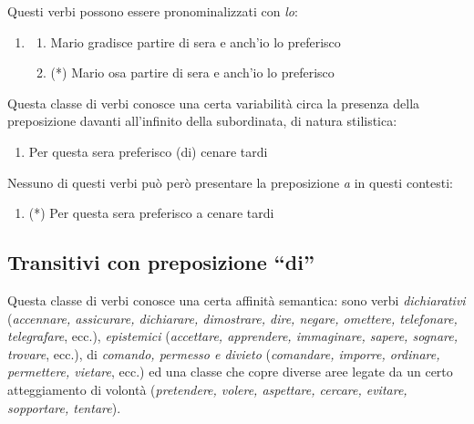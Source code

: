 \documentclass[
  a4paper,
  twoside,
  11pt,
  chapterprefix=false,
  bibliography=totocnumbered,
  listof=flat]{scrbook}
\providecommand{\tightlist}{%
  \setlength{\itemsep}{0pt}\setlength{\parskip}{0pt}}
\begin{document}
Questi verbi possono essere pronominalizzati con \emph{lo}:

\begin{enumerate}
\def\labelenumi{(\arabic{enumi})}
\setcounter{enumi}{57}
\item
  \begin{enumerate}
  \def\labelenumii{\alph{enumii}.}
  \tightlist
  \item
    Mario gradisce partire di sera e anch'io lo preferisco
  \item
    (*) Mario osa partire di sera e anch'io lo preferisco
  \end{enumerate}
\end{enumerate}

Questa classe di verbi conosce una certa variabilità circa la presenza della preposizione davanti all'infinito della subordinata, di natura stilistica:

\begin{enumerate}
\def\labelenumi{(\arabic{enumi})}
\setcounter{enumi}{58}
\tightlist
\item
  Per questa sera preferisco (di) cenare tardi
\end{enumerate}

Nessuno di questi verbi può però presentare la preposizione \emph{a} in questi contesti:

\begin{enumerate}
\def\labelenumi{(\arabic{enumi})}
\setcounter{enumi}{59}
\tightlist
\item
  (*) Per questa sera preferisco a cenare tardi
\end{enumerate}

\hypertarget{transitivi-con-preposizione-di}{%
\subsection{\texorpdfstring{Transitivi con preposizione \enquote{di}}{Transitivi con preposizione ``di''}}\label{transitivi-con-preposizione-di}}

Questa classe di verbi conosce una certa affinità semantica: sono verbi \emph{dichiarativi} (\emph{accennare, assicurare, dichiarare, dimostrare, dire, negare, omettere, telefonare, telegrafare}, ecc.), \emph{epistemici} (\emph{accettare, apprendere, immaginare, sapere, sognare, trovare}, ecc.), di \emph{comando, permesso e divieto} (\emph{comandare, imporre, ordinare, permettere, vietare}, ecc.) ed una classe che copre diverse aree legate da un certo atteggiamento di volontà (\emph{pretendere, volere, aspettare, cercare, evitare, sopportare, tentare}).
\end{document}
